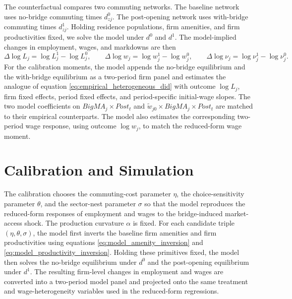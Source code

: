 \documentclass[12pt]{article}
\begin{document}
The counterfactual compares two commuting networks. The baseline network uses no-bridge commuting times \(d^0_{zj}\). The post-opening network uses with-bridge commuting times \(d^1_{zj}\). Holding residence populations, firm amenities, and firm productivities fixed, we solve the model under \(d^0\) and \(d^1\). The model-implied changes in employment, wages, and markdowns are then
\[
    \Delta\log L_j=\log L_j^1-\log L_j^0,\qquad
    \Delta\log w_j=\log w_j^1-\log w_j^0,\qquad
    \Delta\log \nu_j=\log \nu_j^1-\log \nu_j^0.
\]
For the calibration moments, the model appends the no-bridge equilibrium and the with-bridge equilibrium as a two-period firm panel and estimates the analogue of equation \eqref{eq:empirical_heterogeneous_did} with outcome \(\log L_j\), firm fixed effects, period fixed effects, and period-specific initial-wage slopes. The two model coefficients on \(BigMA_j\times Post_t\) and \(\widetilde{w}_{j0}\times BigMA_j\times Post_t\) are matched to their empirical counterparts. The model also estimates the corresponding two-period wage response, using outcome \(\log w_j\), to match the reduced-form wage moment.

\section{Calibration and Simulation}

The calibration chooses the commuting-cost parameter \(\eta\), the choice-sensitivity parameter \(\theta\), and the sector-nest parameter \(\sigma\) so that the model reproduces the reduced-form responses of employment and wages to the bridge-induced market-access shock. The production curvature \(\alpha\) is fixed. For each candidate triple \((\eta,\theta,\sigma)\), the model first inverts the baseline firm amenities and firm productivities using equations \eqref{eq:model_amenity_inversion} and \eqref{eq:model_productivity_inversion}. Holding these primitives fixed, the model then solves the no-bridge equilibrium under \(d^0\) and the post-opening equilibrium under \(d^1\). The resulting firm-level changes in employment and wages are converted into a two-period model panel and projected onto the same treatment and wage-heterogeneity variables used in the reduced-form regressions.
\end{document}
